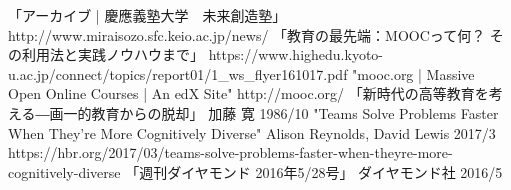 \documentclass[uplatex, a4j]{jsarticle}
\begin{document}
\begin{thebibliography}{数字}
   「アーカイブ | 慶應義塾大学　未来創造塾」 http://www.miraisozo.sfc.keio.ac.jp/news/
   「教育の最先端：MOOCって何？ その利用法と実践ノウハウまで」 https://www.highedu.kyoto-u.ac.jp/connect/topics/report01/1\_ws\_flyer161017.pdf
   "mooc.org | Massive Open Online Courses | An edX Site" http://mooc.org/
   「新時代の高等教育を考える―画一的教育からの脱却」 加藤 寛 1986/10
   "Teams Solve Problems Faster When They’re More Cognitively Diverse" Alison Reynolds, David Lewis 2017/3 https://hbr.org/2017/03/teams-solve-problems-faster-when-theyre-more-cognitively-diverse
   「週刊ダイヤモンド 2016年5/28号」 ダイヤモンド社 2016/5
\end{thebibliography}
\end{document}
